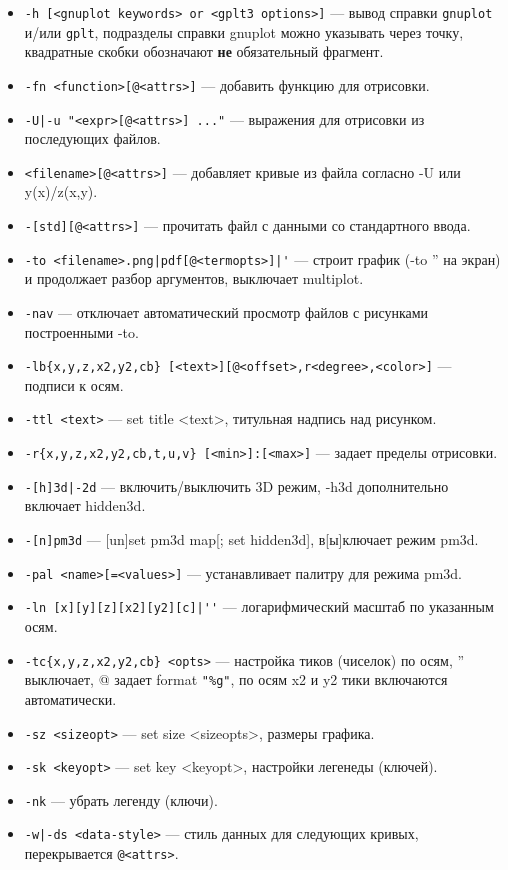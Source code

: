 \documentclass[12pt]{article}
\def\gplt{{\tt gplt}}
\def\gnuplot{{\tt gnuplot}}
\begin{document}
\begin{itemize}
\item \verb'-h [<gnuplot keywords> or <gplt3 options>]' --- вывод справки \gnuplot{} и/или \gplt, 
  подразделы справки gnuplot можно указывать через точку,  квадратные скобки обозначают  {\bf не} обязательный фрагмент.
\item \verb'-fn <function>[@<attrs>]' --- добавить функцию для отрисовки.
\item \verb'-U|-u "<expr>[@<attrs>] ..."' --- выражения для отрисовки из последующих файлов.
\item \verb'<filename>[@<attrs>]' --- добавляет кривые из файла согласно -U или y(x)/z(x,y).
\item \verb'-[std][@<attrs>]' --- прочитать файл с данными со стандартного ввода.
\item \verb:-to <filename>.png|pdf[@<termopts>]|': --- строит график (-to '' на экран)
    и продолжает разбор аргументов, выключает multiplot. 
\item \verb'-nav' --- отключает автоматический просмотр файлов с рисунками построенными -to.                     
\item \verb'-lb{x,y,z,x2,y2,cb} [<text>][@<offset>,r<degree>,<color>]' --- подписи к осям.
\item \verb'-ttl <text>' --- set title <text>,  титульная надпись над рисунком.
\item \verb'-r{x,y,z,x2,y2,cb,t,u,v} [<min>]:[<max>]' --- задает пределы отрисовки.
\item \verb'-[h]3d|-2d' --- включить/выключить 3D режим, -h3d дополнительно включает hidden3d.
\item \verb'-[n]pm3d' --- [un]set pm3d map[; set hidden3d], в[ы]ключает режим pm3d.
\item \verb'-pal <name>[=<values>]' --- устанавливает палитру для режима pm3d.
\item \verb:-ln [x][y][z][x2][y2][c]|'': --- логарифмический масштаб по указанным осям.
\item \verb'-tc{x,y,z,x2,y2,cb} <opts>'  --- настройка тиков (чиселок) по осям, '' выключает,
             @ задает format \verb'"%g"', по осям x2 и y2 тики включаются автоматически. 
\item \verb'-sz <sizeopt>' ---  set size <sizeopts>, размеры графика. 
\item \verb'-sk <keyopt>' --- set key <keyopt>, настройки легенеды (ключей).
\item \verb'-nk' --- убрать легенду (ключи). 
\item \verb'-w|-ds <data-style>'  --- стиль данных для следующих кривых, перекрывается \verb'@<attrs>'.

\end{itemize}
\end{document}
